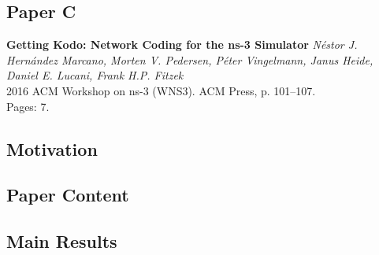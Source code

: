 \subsection{Paper C}
\textbf{Getting Kodo: Network Coding for the ns-3 Simulator}
\textit{N\'estor J. Hern\'andez Marcano, Morten V. Pedersen, P\'eter
Vingelmann, Janus Heide, Daniel E. Lucani, Frank H.P. Fitzek}
\\ 2016 ACM Workshop on ns-3 (WNS3). ACM Press, p. 101--107.
\\ Pages: 7.
\subsection*{Motivation}
 \subsection*{Paper Content}
\subsection*{Main Results}
